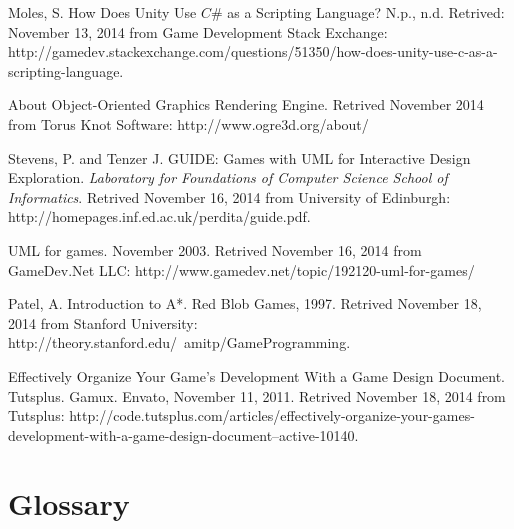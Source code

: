 \documentclass[12pt]{article}       %
\begin{document}
\begin{thebibliography}{99}
 Moles, S. How Does Unity Use $C\#$ as a Scripting Language? N.p., n.d. Retrived: November 13, 2014 from Game Development Stack Exchange: http://gamedev.stackexchange.com/questions/51350/how-does-unity-use-c-as-a-scripting-language.

 About Object-Oriented Graphics Rendering Engine. Retrived November 2014 from Torus Knot Software: http://www.ogre3d.org/about/

 Stevens, P. and Tenzer J. GUIDE: Games with UML for Interactive Design Exploration. 
{ \it Laboratory for Foundations of Computer Science School of Informatics}. Retrived November 16, 2014 from University of Edinburgh: http://homepages.inf.ed.ac.uk/perdita/guide.pdf.

 UML for games. November 2003. Retrived November 16, 2014 from GameDev.Net LLC: http://www.gamedev.net/topic/192120-uml-for-games/

 Patel, A. Introduction to A*. Red Blob Games, 1997. Retrived November 18, 2014 from Stanford University: http://theory.stanford.edu/~amitp/GameProgramming.
 
 Effectively Organize Your Game's Development With a Game Design Document. Tutsplus. Gamux. Envato, November 11, 2011. Retrived November 18, 2014 from Tutsplus: http://code.tutsplus.com/articles/effectively-organize-your-games-development-with-a-game-design-document--active-10140. 


\end{thebibliography}

\newpage

\section{Glossary}
\label{sec:gloss}
\end{document}
